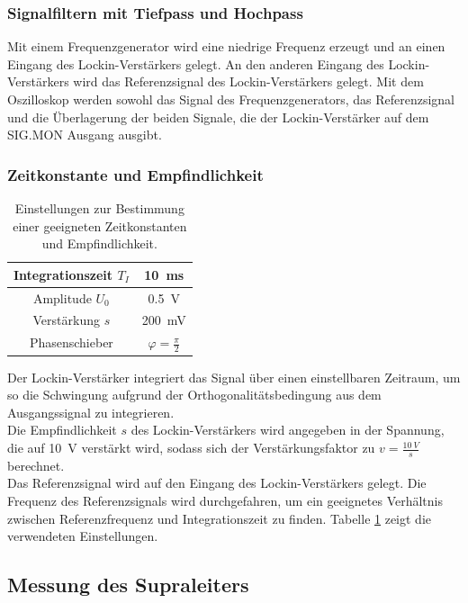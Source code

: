 \documentclass[12pt,a4paper]{article}
\begin{document}
\subsubsection{Signalfiltern mit Tiefpass und Hochpass}
Mit einem Frequenzgenerator wird eine niedrige Frequenz erzeugt und an einen Eingang des Lockin-Verstärkers gelegt. An den anderen Eingang des Lockin-Verstärkers wird das Referenzsignal des Lockin-Verstärkers gelegt. Mit dem Oszilloskop werden sowohl das Signal des Frequenzgenerators, das Referenzsignal und die Überlagerung der beiden Signale, die der Lockin-Verstärker auf dem SIG.MON Ausgang ausgibt.

\subsubsection{Zeitkonstante und Empfindlichkeit}

\begin{table}
\centering
\begin{tabular}{|c|c|}
\hline 
Integrationszeit $T_I$ & \SI{10}{ms} \\ 
\hline 
Amplitude $U_0$ & \SI{0,5}{V} \\
\hline 
Verstärkung $s$ & \SI{200}{mV} \\ 
\hline 
Phasenschieber & $\varphi = \frac{\pi}{2}$ \\ 
\hline 
\end{tabular} 
\caption{Einstellungen zur Bestimmung einer geeigneten Zeitkonstanten und Empfindlichkeit.}
\label{tab:Zeitkonst_Einstellungen}
\end{table}

Der Lockin-Verstärker integriert das Signal über einen einstellbaren Zeitraum, um so die Schwingung aufgrund der Orthogonalitätsbedingung aus dem Ausgangssignal zu integrieren. \\
Die Empfindlichkeit $s$ des Lockin-Verstärkers wird angegeben in der Spannung, die auf \SI{10}{V} verstärkt wird, sodass sich der Verstärkungsfaktor zu $v = \frac{\SI{10}{V}}{s}$ berechnet. \\
Das Referenzsignal wird auf den Eingang des Lockin-Verstärkers gelegt. Die Frequenz des Referenzsignals wird durchgefahren, um ein geeignetes Verhältnis zwischen Referenzfrequenz und Integrationszeit zu finden. Tabelle \ref{tab:Zeitkonst_Einstellungen} zeigt die verwendeten Einstellungen.


\subsection{Messung des Supraleiters}
\end{document}
